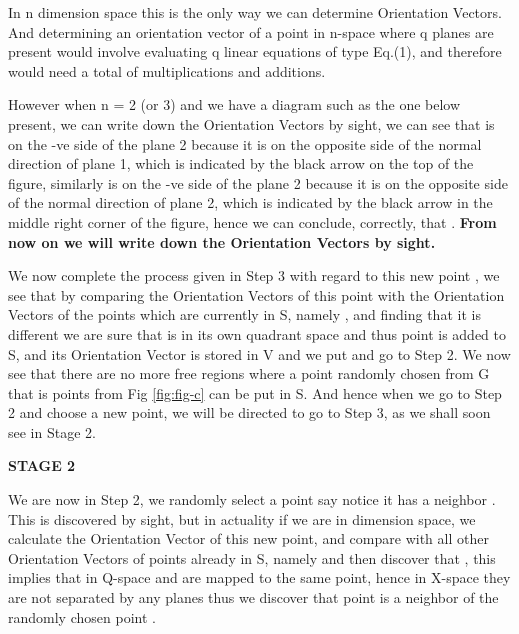 \documentclass[english]{article}
\begin{document}
In n dimension space this is the only way we can determine
Orientation Vectors. And determining an orientation vector of a point
in n-space where q planes are present would involve evaluating q linear
equations of type Eq.(1), and therefore would need a total of 
multiplications and  additions.

 However when n = 2 (or 3) and
we have a diagram such as the one below present, we can write down
the Orientation Vectors by sight, we can see
that  is on the -ve side of the plane 2 because it is on the
opposite side of the normal direction of plane 1, which is indicated
by the black arrow on the top of the figure, similarly  is
on the -ve side of the plane 2 because it is on the opposite side
of the normal direction of plane 2, which is indicated by the black
arrow in the middle right corner of the figure, hence we can conclude, correctly, that . \textbf{From now on
we will write down the Orientation Vectors by sight. }

We now complete the process given in Step 3 with regard to this new
point , we see that by comparing the Orientation Vectors of
this point  with the Orientation Vectors of the points which
are currently in S, namely  , and finding that
it is different we are sure that  is in its own quadrant space
and thus point  is added to S, and its Orientation Vector is
stored in V and we put  and go to Step 2. We now see that
there are no more free regions where a point randomly chosen from G that is points from Fig \ref{fig:fig-c} can be put in S.
And hence when we go to Step 2 and choose a new point, we will be directed to go to Step 3, as we shall soon see in Stage 2.
  

\medskip{}
\medskip{}


\textbf{STAGE 2}

 We are now in Step 2, we randomly select a point say  notice
it has a neighbor  . This is discovered by sight, but in actuality 
if we are in  dimension space, we calculate the Orientation Vector
of this new point,  and compare with all other Orientation
Vectors of points already in S, namely 
and then discover that , this implies
that in Q-space and  are mapped to the same point,
hence in X-space they are not separated by any planes thus we discover
that point  is a neighbor of the randomly chosen point .
\end{document}
